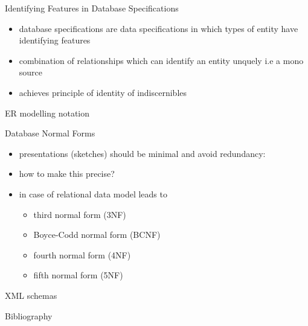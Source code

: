 \documentclass[xcolor=pst,dvips]{beamer}   %
\renewcommand{\erpictureFolder}[0]{../SharedPictures}
\begin{document}
\begin{frame}{Identifying Features in Database Specifications}
\begin{itemize}
\item database specifications are data specifications in which types of entity have 
identifying features
\item combination of relationships which can identify an entity unquely
i.e a mono source
\item achieves principle of identity of indiscernibles
\end {itemize}
\end{frame}


\begin{frame}{ER modelling notation}
\begin{center}
\scalebox{0.85}{

}
\end{center}
\end{frame}


\begin{frame}{Database Normal Forms}
\begin{itemize}
\item presentations (sketches) should be minimal and avoid redundancy:
\item how to make this precise?
\item in case of relational data model leads to 
   \begin{itemize}
     \item third normal form (3NF)
     \item Boyce-Codd normal form (BCNF)
     \item fourth normal form (4NF)
     \item fifth normal form (5NF)
   \end{itemize}
\end{itemize}
\end{frame}

\begin{frame}{XML schemas}

\end{frame}


\begin{frame}{Bibliography}

\end{frame}
\end{document}
